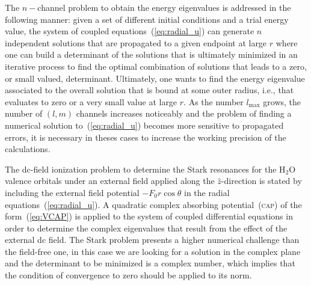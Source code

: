 The $n-$channel problem to obtain the energy eigenvalues is addressed
in the following manner: given a set of different initial conditions
and a trial energy value, the system of coupled
equations~(\ref{eq:radial_u}) can generate $n$ independent solutions
that are propagated to a given endpoint at large $r$ where one can
build a determinant of the solutions that is ultimately minimized in
an iterative process to find the optimal combination of solutions that
leads to a zero, or small valued, determinant. Ultimately, one wants
to find the energy eigenvalue associated to the overall solution that
is bound at some outer radius, i.e., that evaluates to zero or a very
small value at large $r$. As the number $l_{\mathrm{max}}$ grows, the
number of $(l,m)$ channels increases noticeably and the problem of
finding a numerical solution to~(\ref{eq:radial_u}) becomes more
sensitive to propagated errors, it is necessary in theses cases to
increase the working precision of the calculations.


The dc-field ionization problem to determine the Stark resonances for
the H$_{2}$O valence orbitals under an external field applied along
the $\hat{z}$-direction is stated by including the external field
potential $-F_{0}r\cos\theta$ in the radial
equations~(\ref{eq:radial_u}). A quadratic complex absorbing
potential~(\textsc{cap}) of the form~(\ref{eq:VCAP})
%
%
is applied to the system of coupled differential equations in order to
determine the complex eigenvalues that result from the effect of the
external dc field. The Stark problem presents a higher numerical
challenge than the field-free one, in this case we are looking for a
solution in the complex plane and the determinant to be minimized is a
complex number, which implies that the condition of convergence to
zero should be applied to its norm.


